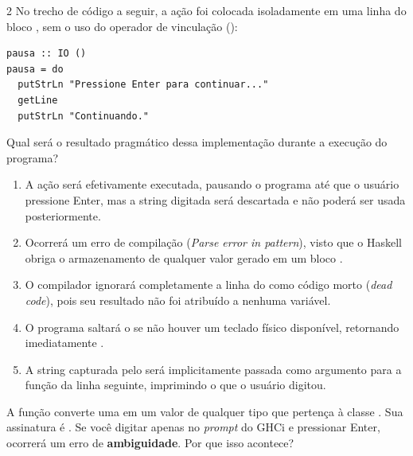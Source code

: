 \documentclass[a4paper,10pt,brazil]{article}
\begin{document}
\begin{multicols}{2}
No trecho de código a seguir, a ação  foi colocada isoladamente em uma linha do bloco , sem o uso do operador de vinculação (\haskellinline{<-}):

\begin{verbatim}
pausa :: IO ()
pausa = do
  putStrLn "Pressione Enter para continuar..."
  getLine
  putStrLn "Continuando."
\end{verbatim}

Qual será o resultado pragmático dessa implementação durante a execução do programa?

\begin{enumerate}
  \item A ação  será efetivamente executada, pausando o programa até que o usuário pressione Enter, mas a string digitada será descartada e não poderá ser usada posteriormente.

  \item Ocorrerá um erro de compilação (\emph{Parse error in pattern}), visto que o Haskell obriga o armazenamento de qualquer valor gerado em um bloco .

  \item O compilador ignorará completamente a linha do  como código morto (\emph{dead code}), pois seu resultado não foi atribuído a nenhuma variável.

  \item O programa saltará o  se não houver um teclado físico disponível, retornando imediatamente .

  \item A string capturada pelo  será implicitamente passada como argumento para a função  da linha seguinte, imprimindo o que o usuário digitou.


\end{enumerate}

A função  converte uma  em um valor de qualquer tipo que pertença à classe . Sua assinatura é . 
Se você digitar apenas  no \emph{prompt} do GHCi e pressionar Enter, ocorrerá um erro de \textbf{ambiguidade}. Por que isso acontece?


\end{multicols}
\end{document}
